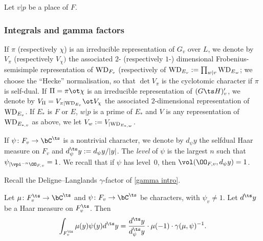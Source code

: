  Let $v \vert p$ be a place of $F$.
\subsubsection{Integrals and gamma factors}
If $\pi$  (respectively $\chi$) is an irreducible representation of $G_{v}$ over $L$, we denote by $V_{\pi}$ (respectively $V_{\chi})$ the associated  $2$- (respectively $1$-) dimensional Frobenius-semisimple representation of ${\rm WD}_{F_{v}}$ (respectively of  ${\rm WD}_{E_{v}}:=\prod_{w\vert v}{\rm WD}_{E_{w}}$; we choose the  ``Hecke'' normalisation, so that $\det V_{\pi}$ is the cyclotomic character if $\pi$ is self-dual.
If $\Pi=\pi\ot \chi$ is an irreducible representation of $(G\ts H)'_{v}$, we denote by $V_{\Pi}= V_{\pi|{\rm WD}_{E_{v}}}\ot V_{\chi}$ the  associated  $2$-dimensional representation of ${\rm WD}_{E_{v}}$.
If $E_{*} $ is $F$ or $E$, $w\vert p$ is a prime of $E_{*}$   and $V$ is any representation of ${\rm WD}_{E_{*,v}}$ as above, we let $V_{w}:= V_{|{\rm WD}_{E_{*, w}}}$.



 If $\psi\colon F_{v}\to \bC^{\ts}$ is a nontrivial character, we denote by $d_{\psi} y$ the selfdual Haar measure on $F_{v}$ and $d^{\ts}_{\psi}y:= d_{\psi}y/|y|$. The \emph{level} of $\psi$ is the largest $n$ such that $\psi_{|\vpi^{-n}\OO_{F, v}}=1$. We recall that if $\psi$ has level~0, then $\vol(\OO_{F, v},d_{\psi}y)=1$.

 Recall the Deligne--Langlands $\gamma$-factor  of \eqref{gamma intro}.

\begin{lemm} 
Let $\mu\colon F_{v}^{\ts}\to \bC^{\ts}$ and $\psi\colon F_{v}\to \bC^{\ts}$ be  characters, with $\psi_{v}\neq 1$. Let $d^{\ts}y$ be a Haar measure on $F_{v}^{\ts}$.
Then
$$\int_{F_{v}^{\ts}} \mu(y) \psi(y) d^{\ts}y={d^{\ts}y \over d^{\ts}_{\psi}y}  \cdot \mu(-1)\cdot  \gamma(\mu, \psi)^{-1} .$$
\end{lemm}







